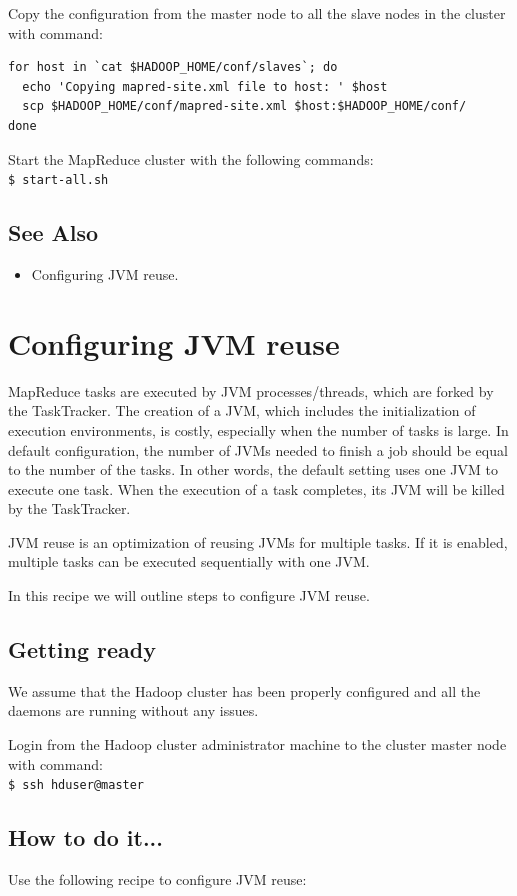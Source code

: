 Copy the configuration from the master node to all the slave nodes in the cluster with command:
\lstset{style=bashstyle}
\begin{lstlisting}
for host in `cat $HADOOP_HOME/conf/slaves`; do
  echo 'Copying mapred-site.xml file to host: ' $host
  scp $HADOOP_HOME/conf/mapred-site.xml $host:$HADOOP_HOME/conf/
done
\end{lstlisting}

Start the MapReduce cluster with the following commands: \\
\verb|$ start-all.sh|

\subsection*{See Also}
\begin{itemize}
  \item Configuring JVM reuse.
\end{itemize}
\section{Configuring JVM reuse}
MapReduce tasks are executed by JVM processes/threads, which are forked by the TaskTracker. The creation of a JVM, which includes the initialization of execution environments, is costly, especially when the number of tasks is large. In default configuration, the number of JVMs needed to finish a job should be equal to the number of the tasks. In other words, the default setting uses one JVM to execute one task. When the execution of a task completes, its JVM will be killed by the TaskTracker.

JVM reuse is an optimization of reusing JVMs for multiple tasks. If it is enabled, multiple tasks can be executed sequentially with one JVM.

In this recipe we will outline steps to configure JVM reuse.
\subsection*{Getting ready}
We assume that the Hadoop cluster has been properly configured and all the daemons are running without any issues.

Login from the Hadoop cluster administrator machine to the cluster master node with command: \\
\verb|$ ssh hduser@master|
\subsection*{How to do it...}
Use the following recipe to configure JVM reuse:


